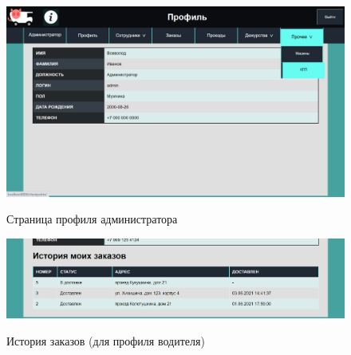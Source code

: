 \begin{figure}[h!] 
	\begin{center}
		{\includegraphics[scale=0.45, angle=0]{sc/admin_profile}}
		\caption{Страница профиля администратора}
		\label{sc:navbar}
	\end{center}
\end{figure}

\begin{figure}[h!] 
	\begin{center}
		{\includegraphics[scale=0.45, angle=0]{sc/driver_profile}}
		\caption{История заказов (для профиля водителя)}
		\label{sc:driver_profile}
	\end{center}
\end{figure}

